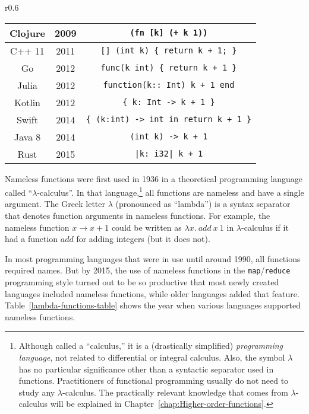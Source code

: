 \begin{wraptable}{r}{0.6\columnwidth}
\begin{centering}
\begin{tabular}{|c|c|c|}
\hline 
{\footnotesize{}Clojure} & {\footnotesize{}2009} & \lstinline!(fn [k] (+ k 1))!\tabularnewline
\hline 
{\footnotesize{}C++ 11} & {\footnotesize{}2011} & \lstinline![] (int k) { return k + 1; }!\tabularnewline
\hline 
{\footnotesize{}Go} & {\footnotesize{}2012} & \lstinline!func(k int) { return k + 1 }!\tabularnewline
\hline 
{\footnotesize{}Julia} & {\footnotesize{}2012} & \lstinline!function(k:: Int) k + 1 end!\tabularnewline
\hline 
{\footnotesize{}Kotlin} & {\footnotesize{}2012} & \lstinline!{ k: Int -> k + 1 }!\tabularnewline
\hline 
{\footnotesize{}Swift} & {\footnotesize{}2014} & \lstinline!{ (k:int) -> int in return k + 1 }!\tabularnewline
\hline 
{\footnotesize{}Java 8} & {\footnotesize{}2014} & \lstinline!(int k) -> k + 1!\tabularnewline
\hline 
{\footnotesize{}Rust} & {\footnotesize{}2015} & \lstinline!|k: i32| k + 1!\tabularnewline
\hline 
\end{tabular}
\par\end{centering}
\caption{Nameless functions in programming languages.\label{lambda-functions-table}}
\vspace{-3\baselineskip}
\end{wraptable}%

Nameless functions were first used in 1936 in a theoretical programming
language called \textsf{``}$\lambda$-calculus\textsf{''}.
In that language,\footnote{Although called a \textsf{``}calculus,\textsf{''} it is a (drastically simplified)
\emph{programming} \emph{language}, not related to differential or
integral calculus. Also, the symbol $\lambda$ has no particular significance
other than a syntactic separator used in  functions. Practitioners
of functional programming usually do not need to study any $\lambda$-calculus.
The practically relevant knowledge that comes from $\lambda$-calculus
will be explained in Chapter~\ref{chap:Higher-order-functions}.} all functions are nameless and have a single argument. The Greek
letter $\lambda$ (pronounced as \textsf{``}lambda\textsf{''}) is a syntax separator
that denotes function arguments in nameless functions. For example,
the nameless function $x\rightarrow x+1$ could be written as $\lambda x.~add~x~1$
in $\lambda$-calculus if it had a function $add$ for adding integers
(but it does not).

In most programming languages that were in use until around 1990,
all functions required names. But by 2015, the use of nameless functions
in the \lstinline!map!/\lstinline!reduce! programming style
turned out to be so productive that most newly created languages included
nameless functions, while older languages added that feature. Table~\ref{lambda-functions-table}
shows the year when various languages supported nameless functions.

